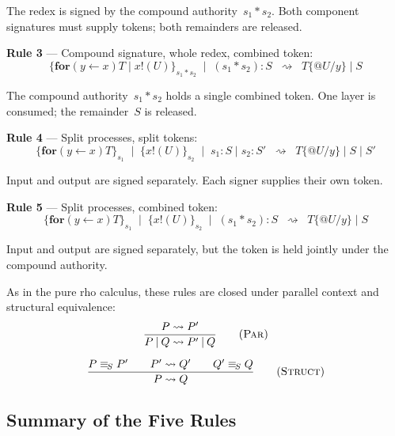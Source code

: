 \documentclass[11pt,a4paper]{article}
\makeatletter
\newcommand{\Par}{\mathbin{|}}
\newcommand{\forc}{\mathbf{for}}
\newcommand{\send}[2]{#1 !\!\left( #2 \right)}
\newcommand{\recv}[3]{\forc\!\left( #1 \leftarrow #2 \right) #3}
\newcommand{\quot}[1]{@#1}
\newcommand{\subst}[3]{#1\{#2 / #3\}}
\newcommand{\signed}[2]{\{#1\}_{#2}}
\newcommand{\comp}{\mathbin{*}}
\newcommand{\Seq}{\equiv_{\!S}}
\newcommand{\red}{\rightsquigarrow}
\makeatother
\begin{document}
\noindent
The redex is signed by the compound authority~$s_1 \comp s_2$.
Both component signatures must supply tokens; both remainders
are released.

\bigskip
\noindent
\textbf{Rule 3} --- Compound signature, whole redex, combined
token:
\begin{equation}
  \boxed{
    \signed{\recv{y}{x}{T} \Par \send{x}{U}}{s_1 \comp s_2}
    \;\Par\; (s_1 \comp s_2) : S
    \;\;\red\;\;
    \subst{T}{\quot{U}}{y} \Par S
  }
  \label{eq:rule3}
\end{equation}

\noindent
The compound authority~$s_1 \comp s_2$ holds a single combined
token.  One layer is consumed; the remainder~$S$ is released.

\bigskip
\noindent
\textbf{Rule 4} --- Split processes, split tokens:
\begin{equation}
  \boxed{
    \signed{\recv{y}{x}{T}}{s_1}
    \;\Par\; \signed{\send{x}{U}}{s_2}
    \;\Par\; s_1 : S \Par s_2 : S'
    \;\;\red\;\;
    \subst{T}{\quot{U}}{y} \Par S \Par S'
  }
  \label{eq:rule4}
\end{equation}

\noindent
Input and output are signed separately.  Each signer supplies
their own token.

\bigskip
\noindent
\textbf{Rule 5} --- Split processes, combined token:
\begin{equation}
  \boxed{
    \signed{\recv{y}{x}{T}}{s_1}
    \;\Par\; \signed{\send{x}{U}}{s_2}
    \;\Par\; (s_1 \comp s_2) : S
    \;\;\red\;\;
    \subst{T}{\quot{U}}{y} \Par S
  }
  \label{eq:rule5}
\end{equation}

\noindent
Input and output are signed separately, but the token is held
jointly under the compound authority.

\bigskip
\noindent
As in the pure rho calculus, these rules are closed under
parallel context and structural equivalence:
\begin{gather}
  \frac{P \red P'}{P \Par Q \red P' \Par Q}
  \qquad\text{(\textsc{Par})}
  \label{eq:par-ctx}
  \\[6pt]
  \frac{P \Seq P' \qquad P' \red Q' \qquad Q' \Seq Q}
       {P \red Q}
  \qquad\text{(\textsc{Struct})}
  \label{eq:struct-ctx}
\end{gather}

\subsection{Summary of the Five Rules}
\label{sec:rule-summary}
\end{document}
